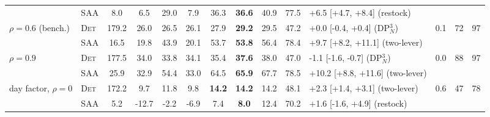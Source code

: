 \begin{table}
\begin{adjustbox}{max width=\linewidth}
\begin{tabular}{l l c ccccccc l ccc}
 & \textsc{SAA} & 8.0 & 6.5 & 29.0 & 7.9 & 36.3 & \textbf{36.6} & 40.9 & 77.5 & +6.5 [+4.7, +8.4] (restock) & & & \\
$\rho = 0.6$ (bench.) & \textsc{Det} & 179.2 & 26.0 & 26.5 & 26.1 & 27.9 & \textbf{29.2} & 29.5 & 47.2 & +0.0 [-0.4, +0.4] (DP$^3_N$) & 0.1 & 72 & 97 \\
 & \textsc{SAA} & 16.5 & 19.8 & 43.9 & 20.1 & 53.7 & \textbf{53.8} & 56.4 & 78.4 & +9.7 [+8.2, +11.1] (two-lever) & & & \\
$\rho = 0.9$ & \textsc{Det} & 177.5 & 34.0 & 33.8 & 34.1 & 35.4 & \textbf{37.6} & 38.0 & 47.0 & -1.1 [-1.6, -0.7] (DP$^3_N$) & 0.0 & 88 & 97 \\
 & \textsc{SAA} & 25.9 & 32.9 & 54.4 & 33.0 & 64.5 & \textbf{65.9} & 67.7 & 78.5 & +10.2 [+8.8, +11.6] (two-lever) & & & \\
day factor, $\rho = 0$ & \textsc{Det} & 172.2 & 9.7 & 11.8 & 9.8 & \textbf{14.2} & \textbf{14.2} & 14.2 & 48.1 & +2.3 [+1.4, +3.1] (two-lever) & 0.6 & 47 & 78 \\
 & \textsc{SAA} & 5.2 & -12.7 & -2.2 & -6.9 & 7.4 & \textbf{8.0} & 12.4 & 70.2 & +1.6 [-1.6, +4.9] (restock) & & & \\
\bottomrule
\end{tabular}
\end{adjustbox}
\end{table}
